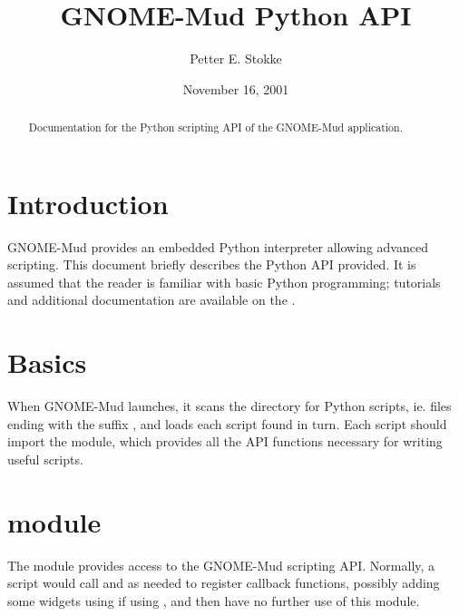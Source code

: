 \documentclass{howto}
\date{November 16, 2001}
\title{GNOME-Mud Python API}
\author{Petter E. Stokke}
\begin{document}
\maketitle

\begin{abstract}
\noindent
Documentation for the Python scripting API of the GNOME-Mud application.
\end{abstract}

\tableofcontents


\section{Introduction}
GNOME-Mud provides an embedded Python interpreter allowing advanced scripting. This document briefly
describes the Python API provided. It is assumed that the reader is familiar with basic Python programming; tutorials and additional
documentation are available on the .

\section{Basics}
When GNOME-Mud launches, it scans the  directory for Python scripts, ie. files ending with the suffix , and
loads each script found in turn. Each script should import the  module, which provides all the API functions necessary
for writing useful scripts.

\section{ module}


The  module provides access to the GNOME-Mud scripting API. Normally, a script would
call  and  as needed to register
callback functions, possibly adding some widgets using  if using ,
and then have no further use of this module.
\end{document}
